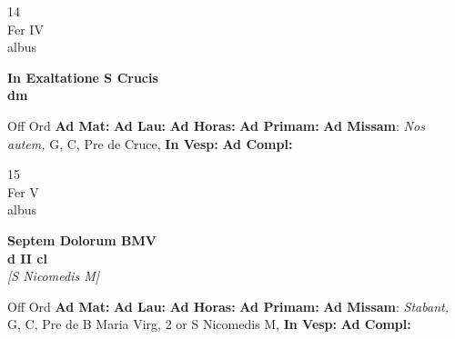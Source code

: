 \documentclass[10pt, openany]{book}
\begin{document}
        \begin{center}
            \begin{minipage}{3.5in}
                \vspace{2em}
                \begin{minipage}{0.5in}
                    {\Huge 14} \\
                    {\normalsize Fer IV} \\
                    {\normalsize albus}
                \end{minipage}
                \begin{minipage}{3.0in}
                    \textbf{ \large In Exaltatione S Crucis \\
                    \textnormal{\normalsize dm}} \\ 
                \end{minipage}
                \begin{justify}Off Ord
                    \textbf{Ad Mat: }
                    \textbf{Ad Lau: }
                    \textbf{Ad Horas: }
                    \textbf{Ad Primam: }\textbf{Ad Missam}: \textit{Nos autem,} G, C, Pre de Cruce,  
                    \textbf{In Vesp: }
                    \textbf{Ad Compl: }
                \end{justify}
            \end{minipage}
        \end{center}
    
        \begin{center}
            \begin{minipage}{3.5in}
                \vspace{2em}
                \begin{minipage}{0.5in}
                    {\Huge 15} \\
                    {\normalsize Fer V} \\
                    {\normalsize albus}
                \end{minipage}
                \begin{minipage}{3.0in}
                    \textbf{ \large Septem Dolorum BMV \\
                    \textnormal{\normalsize d II cl}} \\ \textit{[S Nicomedis M]} \\ 
                \end{minipage}
                \begin{justify}Off Ord
                    \textbf{Ad Mat: }
                    \textbf{Ad Lau: }
                    \textbf{Ad Horas: }
                    \textbf{Ad Primam: }\textbf{Ad Missam}: \textit{Stabant,} G, C, Pre de B Maria Virg, 2 or S Nicomedis M,  
                    \textbf{In Vesp: }
                    \textbf{Ad Compl: }
                \end{justify}
            \end{minipage}
        \end{center}
    
\end{document}
